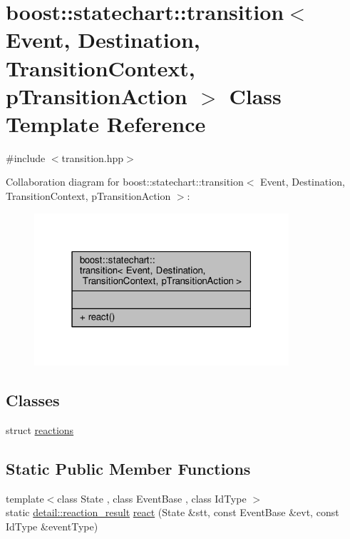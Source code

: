 \hypertarget{classboost_1_1statechart_1_1transition}{}\section{boost\+:\+:statechart\+:\+:transition$<$ Event, Destination, Transition\+Context, p\+Transition\+Action $>$ Class Template Reference}
\label{classboost_1_1statechart_1_1transition}


{\ttfamily \#include $<$transition.\+hpp$>$}



Collaboration diagram for boost\+:\+:statechart\+:\+:transition$<$ Event, Destination, Transition\+Context, p\+Transition\+Action $>$\+:
\nopagebreak
\begin{figure}[H]
\begin{center}
\leavevmode
\includegraphics[width=268pt]{classboost_1_1statechart_1_1transition__coll__graph}
\end{center}
\end{figure}
\subsection*{Classes}
\begin{DoxyCompactItemize}
\item 
struct \mbox{\hyperlink{structboost_1_1statechart_1_1transition_1_1reactions}{reactions}}
\end{DoxyCompactItemize}
\subsection*{Static Public Member Functions}
\begin{DoxyCompactItemize}
\item 
{\footnotesize template$<$class State , class Event\+Base , class Id\+Type $>$ }\\static \mbox{\hyperlink{namespaceboost_1_1statechart_1_1detail_ab091bbb4c29327fb46ee479ea1b7255b}{detail\+::reaction\+\_\+result}} \mbox{\hyperlink{classboost_1_1statechart_1_1transition_a8b4d12e80f8dc176fe4bc2465b4ba9fd}{react}} (State \&stt, const Event\+Base \&evt, const Id\+Type \&event\+Type)
\end{DoxyCompactItemize}


